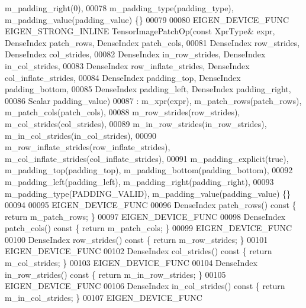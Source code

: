 \begin{DoxyCode}
      m\_padding\_right(0),
00078         m\_padding\_type(padding\_type), m\_padding\_value(padding\_value) \{\}
00079 
00080   EIGEN\_DEVICE\_FUNC EIGEN\_STRONG\_INLINE TensorImagePatchOp(\textcolor{keyword}{const} XprType& expr, DenseIndex patch\_rows, 
      DenseIndex patch\_cols,
00081                                                            DenseIndex row\_strides, DenseIndex col\_strides,
00082                                                            DenseIndex in\_row\_strides, DenseIndex 
      in\_col\_strides,
00083                                                            DenseIndex row\_inflate\_strides, DenseIndex 
      col\_inflate\_strides,
00084                                                            DenseIndex padding\_top, DenseIndex 
      padding\_bottom,
00085                                                            DenseIndex padding\_left, DenseIndex 
      padding\_right,
00086                                                            Scalar padding\_value)
00087       : m\_xpr(expr), m\_patch\_rows(patch\_rows), m\_patch\_cols(patch\_cols),
00088         m\_row\_strides(row\_strides), m\_col\_strides(col\_strides),
00089         m\_in\_row\_strides(in\_row\_strides), m\_in\_col\_strides(in\_col\_strides),
00090         m\_row\_inflate\_strides(row\_inflate\_strides), m\_col\_inflate\_strides(col\_inflate\_strides),
00091         m\_padding\_explicit(\textcolor{keyword}{true}), m\_padding\_top(padding\_top), m\_padding\_bottom(padding\_bottom),
00092         m\_padding\_left(padding\_left), m\_padding\_right(padding\_right),
00093         m\_padding\_type(PADDING\_VALID), m\_padding\_value(padding\_value) \{\}
00094 
00095     EIGEN\_DEVICE\_FUNC
00096     DenseIndex patch\_rows()\textcolor{keyword}{ const }\{ \textcolor{keywordflow}{return} m\_patch\_rows; \}
00097     EIGEN\_DEVICE\_FUNC
00098     DenseIndex patch\_cols()\textcolor{keyword}{ const }\{ \textcolor{keywordflow}{return} m\_patch\_cols; \}
00099     EIGEN\_DEVICE\_FUNC
00100     DenseIndex row\_strides()\textcolor{keyword}{ const }\{ \textcolor{keywordflow}{return} m\_row\_strides; \}
00101     EIGEN\_DEVICE\_FUNC
00102     DenseIndex col\_strides()\textcolor{keyword}{ const }\{ \textcolor{keywordflow}{return} m\_col\_strides; \}
00103     EIGEN\_DEVICE\_FUNC
00104     DenseIndex in\_row\_strides()\textcolor{keyword}{ const }\{ \textcolor{keywordflow}{return} m\_in\_row\_strides; \}
00105     EIGEN\_DEVICE\_FUNC
00106     DenseIndex in\_col\_strides()\textcolor{keyword}{ const }\{ \textcolor{keywordflow}{return} m\_in\_col\_strides; \}
00107     EIGEN\_DEVICE\_FUNC

\end{DoxyCode}
